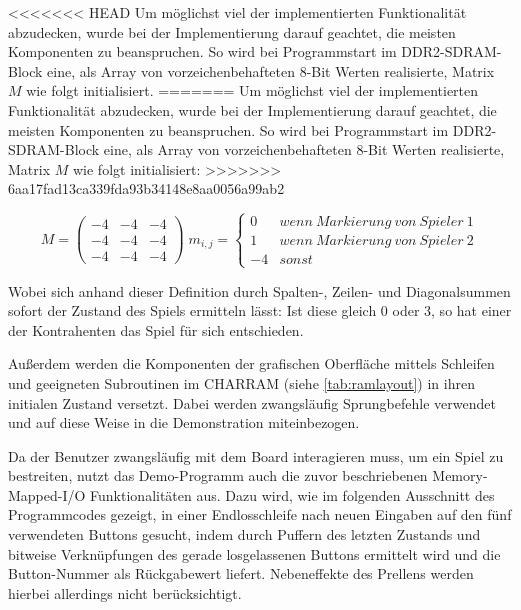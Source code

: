 <<<<<<< HEAD
Um m\"oglichst viel der implementierten Funktionalität abzudecken, wurde bei der Implementierung darauf geachtet, die meisten Komponenten zu beanspruchen. So wird bei Programmstart im DDR2-SDRAM-Block eine, als Array von vorzeichenbehafteten 8-Bit Werten realisierte, Matrix $M$ wie folgt initialisiert.
=======
Um m\"oglichst viel der implementierten Funktionalit\"at abzudecken, wurde bei der Implementierung darauf geachtet, die meisten Komponenten zu beanspruchen. So wird bei Programmstart im DDR2-SDRAM-Block eine, als Array von vorzeichenbehafteten 8-Bit Werten realisierte, Matrix $M$ wie folgt initialisiert:
>>>>>>> 6aa17fad13ca339fda93b34148e8aa0056a99ab2

\[ M = \begin{pmatrix} -4 & -4 & -4\\ -4 & -4 & -4\\ -4 & -4 & -4  \end{pmatrix}\;
 m_{i,j} = \begin{cases}
	0 & wenn\:Markierung\:von\:Spieler\:1 \\
	1 & wenn\:Markierung\:von\:Spieler\:2 \\
	-4 & sonst

\end{cases}\]

Wobei sich anhand dieser Definition durch Spalten-, Zeilen- und Diagonalsummen sofort der Zustand des Spiels ermitteln l\"asst: Ist diese gleich 0 oder 3, so hat einer der Kontrahenten das Spiel f\"ur sich entschieden.

Au\ss{}erdem werden die Komponenten der grafischen Oberfl\"ache mittels Schleifen und geeigneten Subroutinen im CHARRAM (siehe \ref{tab:ramlayout}) in ihren initialen Zustand versetzt. Dabei werden zwangsl\"aufig Sprungbefehle verwendet und auf diese Weise in die Demonstration miteinbezogen.

Da der Benutzer zwangsl\"aufig mit dem Board interagieren muss, um ein Spiel zu bestreiten, nutzt das Demo-Programm auch die zuvor beschriebenen Memory-Mapped-I/O Funktionalit\"aten aus. Dazu wird, wie im folgenden Ausschnitt des Programmcodes gezeigt, in einer Endlosschleife nach neuen Eingaben auf den f\"unf verwendeten Buttons gesucht, indem durch Puffern des letzten Zustands und bitweise Verkn\"upfungen des gerade losgelassenen Buttons ermittelt wird und die Button-Nummer als R\"uckgabewert liefert. Nebeneffekte des Prellens werden hierbei allerdings nicht ber\"ucksichtigt.

